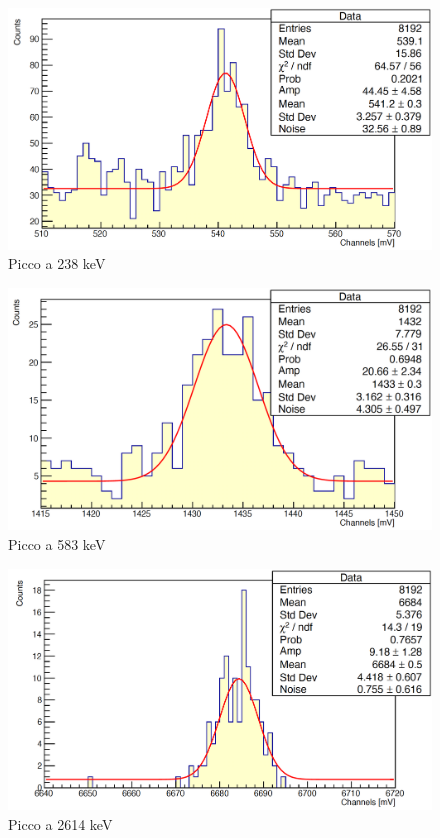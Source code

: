 \documentclass[a4paper,10pt]{article}
\begin{document}
\begin{figure}[H]
    \centering
    \includegraphics[scale=0.45]{appendice/spettri/ThA1_16}
    \caption{Picco a 238 keV}
\end{figure}
\begin{figure}[H]
    \centering
    \includegraphics[scale=0.45]{appendice/spettri/ThA2_16}
    \caption{Picco a 583 keV}
\end{figure}
\begin{figure}[H]
    \centering
    \includegraphics[scale=0.45]{appendice/spettri/ThA3_16}
    \caption{Picco a 2614 keV}
\end{figure}
\end{document}
